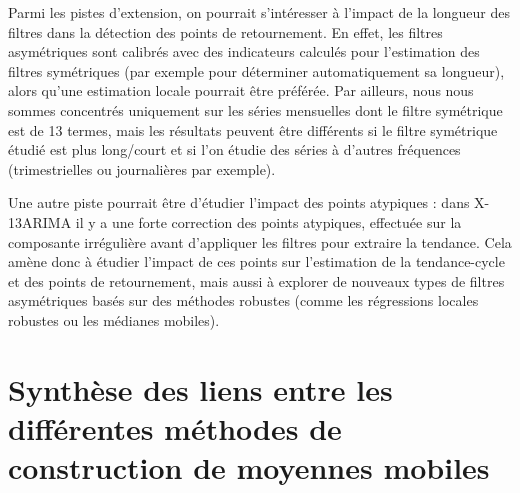\documentclass[
  11pt,
  french,
  a4paper]{article}
\newcommand\1{\mathds{1}}
\begin{document}
Parmi les pistes d'extension, on pourrait s'intéresser à l'impact de la longueur des filtres dans la détection des points de retournement.
En effet, les filtres asymétriques sont calibrés avec des indicateurs calculés pour l'estimation des filtres symétriques (par exemple pour déterminer automatiquement sa longueur), alors qu'une estimation locale pourrait être préférée.
Par ailleurs, nous nous sommes concentrés uniquement sur les séries mensuelles dont le filtre symétrique est de 13 termes, mais les résultats peuvent être différents si le filtre symétrique étudié est plus long/court et si l'on étudie des séries à d'autres fréquences (trimestrielles ou journalières par exemple).

Une autre piste pourrait être d'étudier l'impact des points atypiques : dans X-13ARIMA il y a une forte correction des points atypiques, effectuée sur la composante irrégulière avant d'appliquer les filtres pour extraire la tendance.
Cela amène donc à étudier l'impact de ces points sur l'estimation de la tendance-cycle et des points de retournement, mais aussi à explorer de nouveaux types de filtres asymétriques basés sur des méthodes robustes (comme les régressions locales robustes ou les médianes mobiles).

\newpage

\hypertarget{appendix-annexe}{%
\appendix}


\newpage

\hypertarget{an-diag}{%
\section{Synthèse des liens entre les différentes méthodes de construction de moyennes mobiles}\label{an-diag}}
\end{document}
